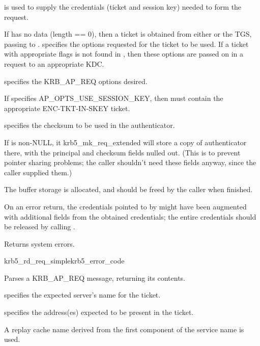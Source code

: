  is used to supply the credentials (ticket and session
key) needed to form the request.

If  has no data (length == 0), then a
ticket is obtained from either  or the TGS, passing
 to . 
 specifies the options requested for the ticket
to be used. If a ticket with appropriate flags is not found in
, then these options are passed on in a request to an
appropriate KDC.

 specifies the KRB_AP_REQ options desired.

If  specifies AP_OPTS_USE_SESSION_KEY, then
 must contain the appropriate
ENC-TKT-IN-SKEY ticket.

 specifies the checksum to be used in the
authenticator.

If  is non-NULL, it krb5_mk_req_extended will store
a copy of authenticator there, with the principal and checksum fields
nulled out.  (This is to prevent pointer sharing problems; the caller
shouldn't need these fields anyway, since the caller supplied them.)

The  buffer storage is allocated, and should be freed
by the caller when finished.

On an error return, the credentials pointed to by 
might have been augmented with additional fields from the obtained
credentials; the entire credentials should be released by calling
.

Returns system errors.

\begin{funcdecl}{krb5_rd_req_simple}{krb5_error_code}{\funcin}
\funcout
{}
\end{funcdecl}

Parses a KRB_AP_REQ message, returning its contents.

 specifies the expected server's name for the ticket.

 specifies the address(es) expected to be present
in the ticket.

A replay cache name derived from the first component of the service name
is used.

